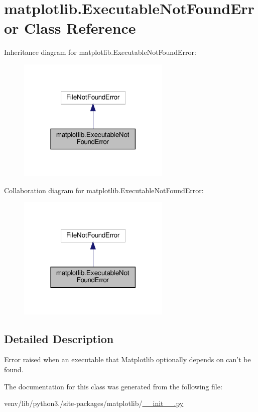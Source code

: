\hypertarget{classmatplotlib_1_1ExecutableNotFoundError}{}\section{matplotlib.\+Executable\+Not\+Found\+Error Class Reference}
\label{classmatplotlib_1_1ExecutableNotFoundError}


Inheritance diagram for matplotlib.\+Executable\+Not\+Found\+Error\+:
\nopagebreak
\begin{figure}[H]
\begin{center}
\leavevmode
\includegraphics[width=206pt]{classmatplotlib_1_1ExecutableNotFoundError__inherit__graph}
\end{center}
\end{figure}


Collaboration diagram for matplotlib.\+Executable\+Not\+Found\+Error\+:
\nopagebreak
\begin{figure}[H]
\begin{center}
\leavevmode
\includegraphics[width=206pt]{classmatplotlib_1_1ExecutableNotFoundError__coll__graph}
\end{center}
\end{figure}


\subsection{Detailed Description}
\begin{DoxyVerb}Error raised when an executable that Matplotlib optionally
depends on can't be found.
\end{DoxyVerb}
 

The documentation for this class was generated from the following file\+:\begin{DoxyCompactItemize}
\item 
venv/lib/python3./site-\/packages/matplotlib/\hyperlink{venv_2lib_2python3_89_2site-packages_2matplotlib_2____init_____8py}{\+\_\+\+\_\+init\+\_\+\+\_\+.\+py}\end{DoxyCompactItemize}
